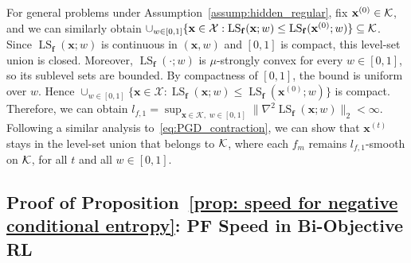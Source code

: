 \documentclass{article}
\newcommand{\bx}{\mathbf{x}}
\newcommand{\X}{\mathcal{X}}
\newcommand{\LS}{\operatorname{LS}}
\newcommand{\f}{\mathbf{f}}
\begin{document}
For general problems under Assumption~\ref{assump:hidden_regular}, fix $\bx^{(0)}\in {\cal K}$, and we can similarly obtain $\cup_{w\in[0,1]}\{\bx\in\X:\LS_{\f}(\bx;w)\le \LS_{\f}(\bx^{(0)};w)\} \subseteq {\cal K}$. Since $\LS_{\f}(\bx;w)$ is continuous in $(\bx,w)$ and $[0,1]$ is compact, this level-set union is closed. Moreover, $\LS_{\f}(\cdot;w)$ is $\mu$-strongly convex for every $w\in[0,1]$, so its sublevel sets are bounded. By compactness of $[0,1]$, the bound is uniform over $w$. Hence $\cup_{w\in[0,1]}\{\bx\in\X:\LS_{\f}(\bx;w)\le \LS_{\f}(\bx^{(0)};w)\}$ is compact. Therefore, we can obtain $l_{f,1}=\sup_{\bx\in\mathcal K,\;w\in[0,1]}\|\nabla^2\LS_{\f}(\bx;w)\|_2<\infty$. Following a similar analysis to~\eqref{eq:PGD_contraction}, we can show that $\bx^{(t)}$ stays in the level-set union that belongs to $\cal K$, where each $f_m$ remains $l_{f,1}$-smooth on $\cal K$, for all $t$ and all $w\in [0,1]$.



\subsection{Proof of Proposition~\ref{prop: speed for negative conditional entropy}: PF Speed in Bi-Objective RL}
\label{appendix: proof of speed for negative conditional entropy}
\end{document}
